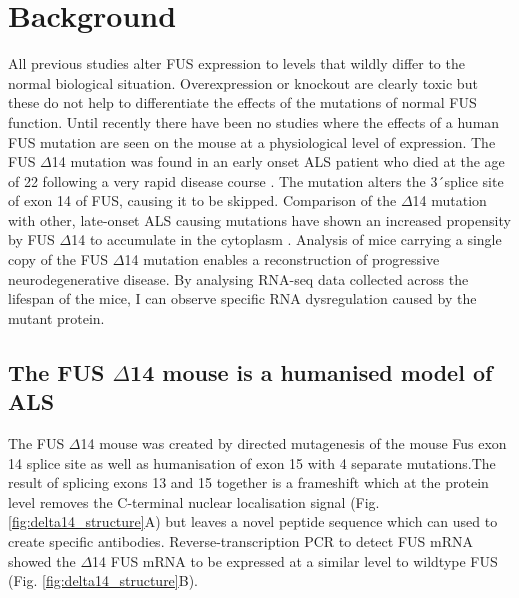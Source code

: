 \section{Background}
All previous studies alter FUS expression to levels that wildly differ to the normal biological situation. Overexpression or knockout are clearly toxic but these do not help to differentiate the effects of the mutations of normal FUS function. 
Until recently there have been no studies where the effects of a human FUS mutation are seen on the mouse at a physiological level of expression. 
The FUS $\Delta$14 mutation was found in an early onset ALS patient who died at the age of 22 following a very rapid disease course \citep{DeJesus-Hernandez2010}. The mutation alters the 3\'\ splice site of exon 14 of FUS, causing it to be skipped.  Comparison of the $\Delta$14 mutation with other, late-onset ALS causing mutations have shown an increased propensity by FUS $\Delta$14 to accumulate in the cytoplasm \citep{Verbeeck2012}. Analysis of mice carrying a single copy of the FUS $\Delta$14 mutation enables a reconstruction of progressive neurodegenerative disease. By analysing RNA-seq data collected across the lifespan of the mice, I can observe specific RNA dysregulation caused by the mutant protein.

\subsection{The FUS $\Delta$14 mouse is a humanised model of ALS}
The FUS $\Delta$14 mouse was created by directed mutagenesis of the mouse Fus exon 14 splice site as well as humanisation of exon 15 with 4 separate mutations.The result of splicing exons 13 and 15 together is a frameshift which at the protein level removes the C-terminal nuclear localisation signal (Fig. \ref{fig:delta14_structure}A) but leaves a novel peptide sequence which can used to create specific antibodies. Reverse-transcription PCR to detect FUS mRNA showed the $\Delta$14 FUS mRNA to be expressed at a similar level to wildtype FUS (Fig. \ref{fig:delta14_structure}B). 


